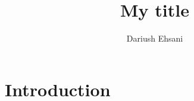 \documentclass{amsart}
\theoremstyle{definition}
\theoremstyle{remark}
\numberwithin{equation}{section}
\begin{document}



\title{
	My title
}

\author{Dariush Ehsani}



\address{
	FIZ Karlsruhe - 
		Leibniz Institute for Information Infrastructure\\
	Department of Mathematics\\
	Franklinstr. 11\\
	D-10587 Berlin\\
	Germany
}

\subjclass[2020]{}


\begin{abstract}

\end{abstract}


\maketitle


\section{Introduction} 
\label{intro} 




\end{document}
